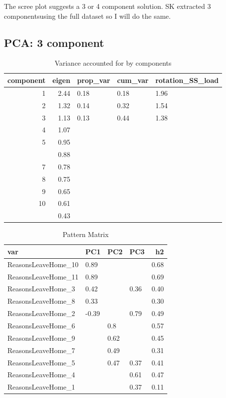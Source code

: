 \documentclass[]{article}
\begin{document}
The scree plot suggests a 3 or 4 component solution. SK extracted 3
componentsusing the full dataset so I will do the same.

\hypertarget{pca-3-component-2}{%
\subsection{PCA: 3 component}\label{pca-3-component-2}}

\begin{table}[H]

\caption{\label{tab:unnamed-chunk-61}Variance accounted for by components}
\centering
\fontsize{6}{8}\selectfont
\begin{tabular}[t]{rrlll}
\toprule
component & eigen & prop\_var & cum\_var & rotation\_SS\_load\\
\midrule
1 & 2.44 & 0.18 & 0.18 & 1.96\\
2 & 1.32 & 0.14 & 0.32 & 1.54\\
3 & 1.13 & 0.13 & 0.44 & 1.38\\
4 & 1.07 &  &  & \\
5 & 0.95 &  &  & \\
\addlinespace
6 & 0.88 &  &  & \\
7 & 0.78 &  &  & \\
8 & 0.75 &  &  & \\
9 & 0.65 &  &  & \\
10 & 0.61 &  &  & \\
\addlinespace
11 & 0.43 &  &  & \\
\bottomrule
\end{tabular}
\end{table}

\begin{table}[H]

\caption{\label{tab:unnamed-chunk-61}Pattern Matrix}
\centering
\fontsize{6}{8}\selectfont
\begin{tabular}[t]{llllr}
\toprule
var & PC1 & PC2 & PC3 & h2\\
\midrule
ReasonsLeaveHome\_10 & 0.89 &  &  & 0.68\\
ReasonsLeaveHome\_11 & 0.89 &  &  & 0.69\\
ReasonsLeaveHome\_3 & 0.42 &  & 0.36 & 0.40\\
ReasonsLeaveHome\_8 & 0.33 &  &  & 0.30\\
ReasonsLeaveHome\_2 & -0.39 &  & 0.79 & 0.49\\
\addlinespace
ReasonsLeaveHome\_6 &  & 0.8 &  & 0.57\\
ReasonsLeaveHome\_9 &  & 0.62 &  & 0.45\\
ReasonsLeaveHome\_7 &  & 0.49 &  & 0.31\\
ReasonsLeaveHome\_5 &  & 0.47 & 0.37 & 0.41\\
ReasonsLeaveHome\_4 &  &  & 0.61 & 0.47\\
\addlinespace
ReasonsLeaveHome\_1 &  &  & 0.37 & 0.11\\
\bottomrule
\end{tabular}
\end{table}
\end{document}
